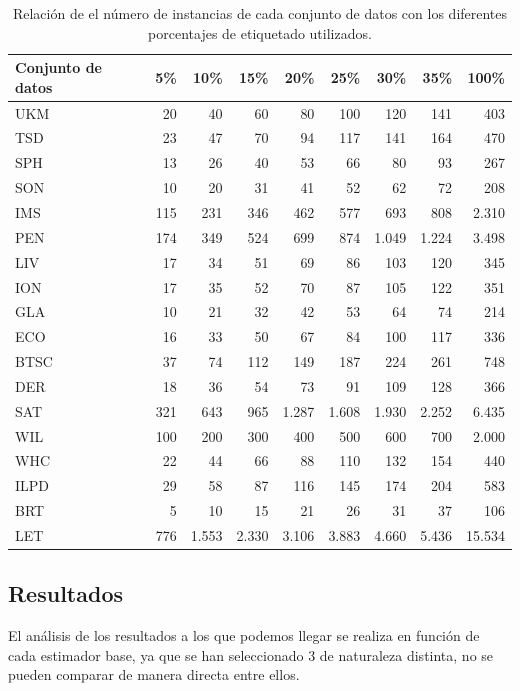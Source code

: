 \begin{table}[]
    \centering
    \tiny
    \begin{tabular}{lrrrrrrr|r}
    \toprule
        \textbf{Conjunto de datos} & \textbf{5\%} & \textbf{10\%} & \textbf{15\%} & \textbf{20\%} & \textbf{25\%} & \textbf{30\%} &\textbf{ 35\%} & \textbf{100\%} \\ 
    \toprule
        UKM & 20 & 40 & 60 & 80 & 100 & 120 & 141 & 403 \\ 
        TSD & 23 & 47 & 70 & 94 & 117 & 141 & 164 & 470 \\ 
        SPH & 13 & 26 & 40 & 53 & 66 & 80 & 93 & 267 \\
        SON & 10 & 20 & 31 & 41 & 52 & 62 & 72 & 208 \\ 
        IMS & 115 & 231 & 346 & 462 & 577 & 693 & 808 & 2.310 \\ 
        PEN & 174 & 349 & 524 & 699 & 874 & 1.049 & 1.224 & 3.498 \\ 
        LIV & 17 & 34 & 51 & 69 & 86 & 103 & 120 & 345 \\ 
        ION & 17 & 35 & 52 & 70 & 87 & 105 & 122 & 351 \\ 
        GLA & 10 & 21 & 32 & 42 & 53 & 64 & 74 & 214 \\
        ECO & 16 & 33 & 50 & 67 & 84 & 100 & 117 & 336 \\
        BTSC & 37 & 74 & 112 & 149 & 187 & 224 & 261 & 748 \\ 
        DER & 18 & 36 & 54 & 73 & 91 & 109 & 128 & 366 \\
        SAT & 321 & 643 & 965 & 1.287 & 1.608 & 1.930 & 2.252 & 6.435 \\ 
        WIL & 100 & 200 & 300 & 400 & 500 & 600 & 700 & 2.000 \\ 
        WHC & 22 & 44 & 66 & 88 & 110 & 132 & 154 & 440 \\ 
        ILPD & 29 & 58 & 87 & 116 & 145 & 174 & 204 & 583 \\ 
        BRT & 5 & 10 & 15 & 21 & 26 & 31 & 37 & 106 \\ 
        LET & 776 & 1.553 & 2.330 & 3.106 & 3.883 & 4.660 & 5.436 & 15.534 \\ 
        \bottomrule
    \end{tabular}
    \caption{Relación de el número de instancias de cada conjunto de datos con los diferentes porcentajes de etiquetado utilizados.}\label{tab:exp:percents}
\end{table}

\FloatBarrier
\subsection{Resultados}
El análisis de los resultados a los que podemos llegar se realiza en función de cada estimador base, ya que se han seleccionado 3 de naturaleza distinta, no se pueden comparar de manera directa entre ellos.

